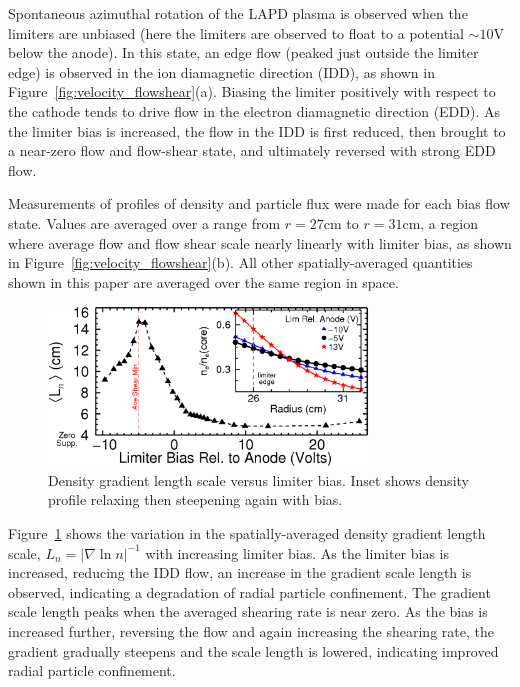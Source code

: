 \documentclass[aps,prl,amsmath,amssymb,reprint,superscriptaddress]{revtex4-1} %
\begin{document}
Spontaneous azimuthal rotation of the LAPD plasma is observed when the limiters are
unbiased (here the limiters are observed to float to a
potential $\sim 10$V below the anode).  In this state, an edge flow
(peaked just outside the limiter edge) is
observed in the ion diamagnetic direction (IDD), as shown in
Figure~\ref{fig:velocity_flowshear}(a).  Biasing the limiter positively
with respect to the cathode tends to drive flow in the electron
diamagnetic direction (EDD).  As the limiter bias is increased, the
flow in the IDD is first reduced, then brought to a near-zero flow
and flow-shear state, and ultimately reversed with strong EDD flow.

Measurements of profiles of density and particle flux
were made for each bias flow state. Values are averaged over a range
from $r=27$cm to $r=31$cm, a region where average flow and flow shear scale
nearly linearly with limiter bias, as shown in
Figure~\ref{fig:velocity_flowshear}(b).  All other spatially-averaged
quantities shown in this paper are averaged over the same region in space.

\begin{figure}[!htbp]
\centerline{
\includegraphics[width=8.5cm]{densgrad.eps}}
\caption{\label{fig:densgrad} Density gradient length scale versus limiter bias. Inset shows density profile relaxing then steepening again with bias.}
\end{figure}

Figure~\ref{fig:densgrad} shows the variation in the spatially-averaged density gradient length scale, $L_{n} = \lvert \nabla \ln n \rvert ^{-1}$ with
increasing limiter bias.  As the limiter bias is increased, reducing
the IDD flow, an increase in the gradient scale length is observed,
indicating a degradation of radial particle confinement. The gradient scale length peaks
when the averaged shearing rate is near zero. As the bias is
increased further, reversing the flow and again increasing the
shearing rate, the gradient gradually steepens and the
scale length is lowered, indicating improved radial particle confinement.  
\end{document}
